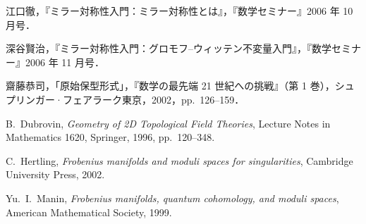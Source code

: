 \begin{reflist}
\item[{[1]}] 江口徹，『ミラー対称性入門：ミラー対称性とは』，『数学セミナー』2006 年 10 月号．
\item[{[2]}] 深谷賢治，『ミラー対称性入門：グロモフ--ウィッテン不変量入門』，『数学セミナー』2006 年 11 月号．
\item[{[3]}] 齋藤恭司，「原始保型形式」，『数学の最先端 21 世紀への挑戦』（第 1 巻），シュプリンガー·フェアラーク東京，2002，pp.~126--159．
\item[{[4]}] B.~Dubrovin, \emph{Geometry of 2D Topological Field Theories}, Lecture Notes in Mathematics 1620, Springer, 1996, pp.~120--348.
\item[{[5]}] C.~Hertling, \emph{Frobenius manifolds and moduli spaces for singularities}, Cambridge University Press, 2002.
\item[{[6]}] Yu.~I.~Manin, \emph{Frobenius manifolds, quantum cohomology, and moduli spaces}, American Mathematical Society, 1999.
\end{reflist}
\renewcommand{\thesection}{\Roman{section}}

